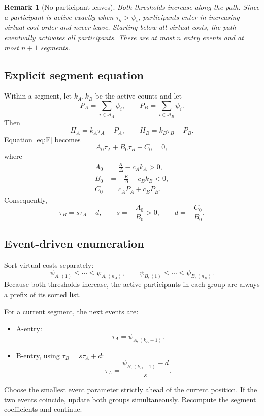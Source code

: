 \documentclass[11pt,a4paper]{article}
\newtheorem{remark}{Remark}
\newcommand{\1}{\mathbf{1}}
\begin{document}
\begin{remark}[No participant leaves]
Both thresholds increase along the path. Since a participant is active
exactly when \(\tau_g>\psi_i\), participants enter in increasing
virtual-cost order and never leave. Starting below all virtual costs,
the path eventually activates all participants. There are at most \(n\)
entry events and at most \(n+1\) segments.
\end{remark}

\subsection{Explicit segment equation}

Within a segment, let \(k_A,k_B\) be the active counts and let
\[
P_A=\sum_{i\in\mathcal A_A}\psi_i,\qquad
P_B=\sum_{i\in\mathcal A_B}\psi_i.
\]
Then
\[
H_A=k_A\tau_A-P_A,\qquad
H_B=k_B\tau_B-P_B.
\]
Equation \eqref{eq:F} becomes
\begin{equation}
  A_0\tau_A+B_0\tau_B+C_0=0,
  \label{eq:segment-line}
\end{equation}
where
\begin{align}
  A_0&=\frac K\Delta-c_Ak_A>0,\\
  B_0&=-\frac K\Delta-c_Bk_B<0,\\
  C_0&=c_AP_A+c_BP_B.
\end{align}
Consequently,
\begin{equation}
  \boxed{
  \tau_B=s\tau_A+d,\qquad
  s=-\frac{A_0}{B_0}>0,\qquad
  d=-\frac{C_0}{B_0}.
  }
  \label{eq:segment-path}
\end{equation}

\subsection{Event-driven enumeration}

Sort virtual costs separately:
\[
\psi_{A,(1)}\leq\cdots\leq\psi_{A,(n_A)},
\qquad
\psi_{B,(1)}\leq\cdots\leq\psi_{B,(n_B)}.
\]
Because both thresholds increase, the active participants in each
group are always a prefix of its sorted list.

For a current segment, the next events are:
\begin{itemize}
  \item A-entry:
  \[
    \tau_A=\psi_{A,(k_A+1)}.
  \]
  \item B-entry, using \(\tau_B=s\tau_A+d\):
  \[
    \tau_A=
    \frac{\psi_{B,(k_B+1)}-d}{s}.
  \]
\end{itemize}
Choose the smallest event parameter strictly ahead of the current
position. If the two events coincide, update both groups simultaneously.
Recompute the segment coefficients and continue.
\end{document}
